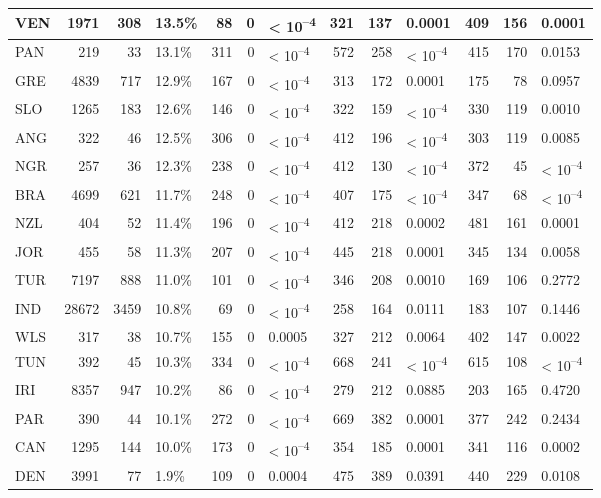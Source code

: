 \begin{tabular}{l|r|r|l|r|r|l|r|r|l|r|r|l}
\hline
VEN & 1971 & 308 & 13.5\% & 88 & 0 & < 10\textsuperscript{--4} & 321 & 137 & 0.0001 & 409 & 156 & 0.0001\\
\hline
PAN & 219 & 33 & 13.1\% & 311 & 0 & < 10\textsuperscript{--4} & 572 & 258 & < 10\textsuperscript{--4} & 415 & 170 & 0.0153\\
\hline
GRE & 4839 & 717 & 12.9\% & 167 & 0 & < 10\textsuperscript{--4} & 313 & 172 & 0.0001 & 175 & 78 & 0.0957\\
\hline
SLO & 1265 & 183 & 12.6\% & 146 & 0 & < 10\textsuperscript{--4} & 322 & 159 & < 10\textsuperscript{--4} & 330 & 119 & 0.0010\\
\hline
ANG & 322 & 46 & 12.5\% & 306 & 0 & < 10\textsuperscript{--4} & 412 & 196 & < 10\textsuperscript{--4} & 303 & 119 & 0.0085\\
\hline
NGR & 257 & 36 & 12.3\% & 238 & 0 & < 10\textsuperscript{--4} & 412 & 130 & < 10\textsuperscript{--4} & 372 & 45 & < 10\textsuperscript{--4}\\
\hline
BRA & 4699 & 621 & 11.7\% & 248 & 0 & < 10\textsuperscript{--4} & 407 & 175 & < 10\textsuperscript{--4} & 347 & 68 & < 10\textsuperscript{--4}\\
\hline
NZL & 404 & 52 & 11.4\% & 196 & 0 & < 10\textsuperscript{--4} & 412 & 218 & 0.0002 & 481 & 161 & 0.0001\\
\hline
JOR & 455 & 58 & 11.3\% & 207 & 0 & < 10\textsuperscript{--4} & 445 & 218 & 0.0001 & 345 & 134 & 0.0058\\
\hline
TUR & 7197 & 888 & 11.0\% & 101 & 0 & < 10\textsuperscript{--4} & 346 & 208 & 0.0010 & 169 & 106 & 0.2772\\
\hline
IND & 28672 & 3459 & 10.8\% & 69 & 0 & < 10\textsuperscript{--4} & 258 & 164 & 0.0111 & 183 & 107 & 0.1446\\
\hline
WLS & 317 & 38 & 10.7\% & 155 & 0 & 0.0005 & 327 & 212 & 0.0064 & 402 & 147 & 0.0022\\
\hline
TUN & 392 & 45 & 10.3\% & 334 & 0 & < 10\textsuperscript{--4} & 668 & 241 & < 10\textsuperscript{--4} & 615 & 108 & < 10\textsuperscript{--4}\\
\hline
IRI & 8357 & 947 & 10.2\% & 86 & 0 & < 10\textsuperscript{--4} & 279 & 212 & 0.0885 & 203 & 165 & 0.4720\\
\hline
PAR & 390 & 44 & 10.1\% & 272 & 0 & < 10\textsuperscript{--4} & 669 & 382 & 0.0001 & 377 & 242 & 0.2434\\
\hline
CAN & 1295 & 144 & 10.0\% & 173 & 0 & < 10\textsuperscript{--4} & 354 & 185 & 0.0001 & 341 & 116 & 0.0002\\
\hline
DEN & 3991 & 77 & 1.9\% & 109 & 0 & 0.0004 & 475 & 389 & 0.0391 & 440 & 229 & 0.0108\\
\hline
\end{tabular}
